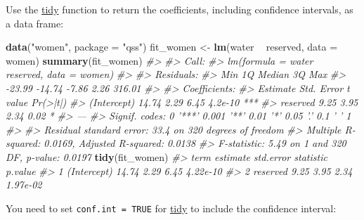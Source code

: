 \documentclass[]{book}
\newenvironment{Shaded}{\begin{snugshade}}{\end{snugshade}}
\newcommand{\KeywordTok}[1]{\textcolor[rgb]{0.13,0.29,0.53}{\textbf{#1}}}
\newcommand{\DataTypeTok}[1]{\textcolor[rgb]{0.13,0.29,0.53}{#1}}
\newcommand{\StringTok}[1]{\textcolor[rgb]{0.31,0.60,0.02}{#1}}
\newcommand{\CommentTok}[1]{\textcolor[rgb]{0.56,0.35,0.01}{\textit{#1}}}
\newcommand{\OperatorTok}[1]{\textcolor[rgb]{0.81,0.36,0.00}{\textbf{#1}}}
\newcommand{\NormalTok}[1]{#1}
\theoremstyle{definition}
\theoremstyle{definition}
\theoremstyle{definition}
\theoremstyle{remark}
\begin{document}
Use the
\href{https://www.rdocumentation.org/packages/broom/topics/tidy}{tidy}
function to return the coefficients, including confidence intervals, as
a data frame:

\begin{Shaded}
\begin{Highlighting}[]
\KeywordTok{data}\NormalTok{(}\StringTok{"women"}\NormalTok{, }\DataTypeTok{package =} \StringTok{"qss"}\NormalTok{)}
\NormalTok{fit_women <-}\StringTok{ }\KeywordTok{lm}\NormalTok{(water }\OperatorTok{~}\StringTok{ }\NormalTok{reserved, }\DataTypeTok{data =}\NormalTok{ women)}
\KeywordTok{summary}\NormalTok{(fit_women)}
\CommentTok{#> }
\CommentTok{#> Call:}
\CommentTok{#> lm(formula = water ~ reserved, data = women)}
\CommentTok{#> }
\CommentTok{#> Residuals:}
\CommentTok{#>    Min     1Q Median     3Q    Max }
\CommentTok{#> -23.99 -14.74  -7.86   2.26 316.01 }
\CommentTok{#> }
\CommentTok{#> Coefficients:}
\CommentTok{#>             Estimate Std. Error t value Pr(>|t|)    }
\CommentTok{#> (Intercept)    14.74       2.29    6.45  4.2e-10 ***}
\CommentTok{#> reserved        9.25       3.95    2.34     0.02 *  }
\CommentTok{#> ---}
\CommentTok{#> Signif. codes:  0 '***' 0.001 '**' 0.01 '*' 0.05 '.' 0.1 ' ' 1}
\CommentTok{#> }
\CommentTok{#> Residual standard error: 33.4 on 320 degrees of freedom}
\CommentTok{#> Multiple R-squared:  0.0169, Adjusted R-squared:  0.0138 }
\CommentTok{#> F-statistic: 5.49 on 1 and 320 DF,  p-value: 0.0197}
\KeywordTok{tidy}\NormalTok{(fit_women)}
\CommentTok{#>          term estimate std.error statistic  p.value}
\CommentTok{#> 1 (Intercept)    14.74      2.29      6.45 4.22e-10}
\CommentTok{#> 2    reserved     9.25      3.95      2.34 1.97e-02}
\end{Highlighting}
\end{Shaded}

You need to set \texttt{conf.int\ =\ TRUE} for
\href{https://www.rdocumentation.org/packages/broom/topics/tidy.lm}{tidy}
to include the confidence interval:
\end{document}
